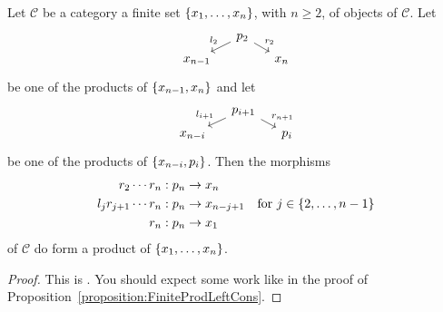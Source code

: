\begin{proposition}\label{proposition:FiniteProdRightCons}
  Let \(\mathcal{C}\) be a category a finite set \(\left\{x_1, \dots{}, x_n\right\}\),
  with \(n \ge 2\), of objects of \(\mathcal{C}\). Let
  \[\begin{tikzcd}[row sep=tiny, column sep=small]
      & p_2 \ar["{l_2}", dl, swap] \ar["{r_2}", dr] \\
      x_{n-1} & & x_n
    \end{tikzcd}\] be one of the products of \(\left\{x_{n-1}, x_n\right\}\) and
  let
  \[\begin{tikzcd}[row sep=tiny, column sep=small]
      & p_{i+1} \ar["{l_{i+1}}", dl, swap] \ar["{r_{n+1}}", dr] \\
      x_{n-i} & & p_i
    \end{tikzcd}\] be one of the products of \(\left\{x_{n-i}, p_i\right\}\).
%
%
  Then the morphisms
  \[\begin{aligned}
    r_2 \cdots{} r_n &: p_n \to x_n \\
    l_j r_{j+1} \cdots{} r_n &: p_n \to x_{n-j+1} \quad \text{for } j \in \left\{2, \dots{}, n-1\right\} \\
    r_n &: p_n \to x_1
  \end{aligned}\]
of \(\mathcal{C}\) do form a product of \(\left\{x_1, \dots{}, x_n\right\}\).
\end{proposition}

\begin{proof}
  This is . You should expect some work like in the
  proof of Proposition~\ref{proposition:FiniteProdLeftCons}.
\end{proof}

